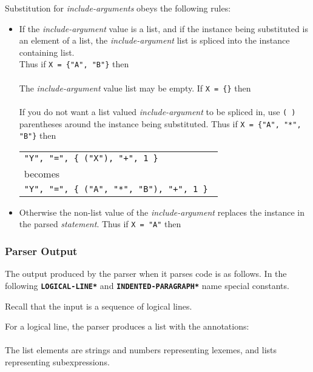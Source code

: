 \documentclass[12pt]{article}
\newcommand{\ttkey}[1]{{\tt \bfseries #1}}
\begin{document}
Substitution for {\em include-arguments} obeys the following rules:
\begin{itemize}
\item \label{INCLUDE-SPLICING} If the {\em include-argument}
value is a list, and if the
instance being substituted is an element of a list,
the {\em include-argument} list is spliced into the instance containing
list.
\\[0.5ex]
Thus if {\tt X = \{"A", "B"\}} then \\
 \\
The {\em include-argument} value list may be empty.
If {\tt X = \{\}} then \\
 \\
If you do not want a list valued {\em include-argument} to be spliced in,
use {\tt (~)} parentheses around the instance being substituted.
Thus if {\tt X = \{"A", "*",  "B"\}} then \\
\hspace*{2em}%
     \begin{tabular}{l}
     \tt "Y", "=", \{ ("X"), "+", 1 \} \\
     becomes \\
     \tt "Y", "=", \{ ("A", "*", "B"), "+", 1 \}
     \end{tabular}

\item Otherwise the non-list value of the {\em include-argument} replaces the
instance in the parsed {\em statement}.
Thus if {\tt X = "A"} then \\
\end{itemize}

\subsubsection{Parser Output}
\label{PARSER-OUTPUT}

The output produced by the parser when it parses code is as
follows.  In the following \ttkey{*LOGICAL-LINE*} and
\ttkey{*INDENTED-PARAGRAPH*} name special constants.

Recall that the input is a sequence of logical lines.

For a logical line, the parser produces a list with the
annotations: \\
\hspace*{0.5in}{\tt ".initiator" => *LOGICAL-LINE*, ".terminator" => "<LF>"} \\
The list elements are strings and numbers representing lexemes, and
lists representing subexpressions.
\end{document}
